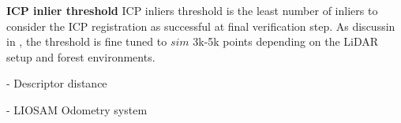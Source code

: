   
\textbf{ICP inlier threshold} \hspace{0.5em} ICP inliers threshold is the least number of inliers to consider the ICP registration as successful at final verification step. As discussin in , the threshold is fine tuned to $sim$ 3k-5k points depending on the LiDAR setup and forest environments. 

  
  


- Descriptor distance 


- LIOSAM Odometry system 


